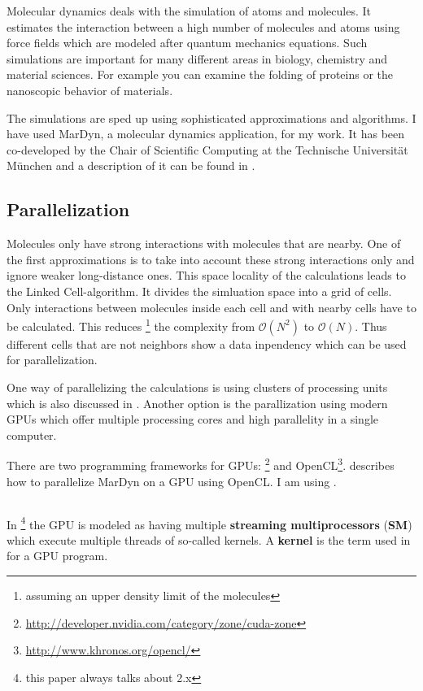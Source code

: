 Molecular dynamics deals with the simulation of atoms and molecules. It estimates the interaction between a high number of molecules and atoms using force fields which are modeled after quantum mechanics equations. 
Such simulations are important for many different areas in biology, chemistry and material sciences. For example you can examine the folding of proteins or the nanoscopic behavior of materials.

The simulations are sped up using sophisticated approximations and algorithms. I have used MarDyn, a molecular dynamics application, for my work. It has been co-developed by the Chair of Scientific Computing at the Technische Universit\"at M\"unchen and a description of it can be found in \cite{buchholz10framework}.

\subsection{Parallelization}
Molecules only have strong interactions with molecules that are nearby. One of the first approximations is to take into account these strong interactions only and ignore weaker long-distance ones.
This space locality of the calculations leads to the Linked Cell-algorithm. It divides the simluation space into a grid of cells. Only interactions between molecules inside each cell and with nearby cells have to be calculated. This reduces \footnote{assuming an upper density limit of the molecules}  
 the complexity from $ \mathcal{O} \left( N^2 \right) $ to $ \mathcal{O} \left( N \right) $.
Thus different cells that are not neighbors show a data inpendency which can be used for parallelization.

One way of parallelizing the calculations is using clusters of processing units which is also discussed in \cite{buchholz10framework}. Another option is the parallization using modern GPUs which offer multiple processing cores and high parallelity in a single computer.

There are two programming frameworks for GPUs: \cuda{}\footnote{\url{http://developer.nvidia.com/category/zone/cuda-zone}} and OpenCL\footnote{\url{http://www.khronos.org/opencl/}}.
\cite{orend10numerische} describes how to parallelize MarDyn on a GPU using OpenCL. I am using \cuda{}.

\subsection{\cuda{}}
In \cuda{}\footnote{this paper always talks about \cuda{} 2.x} the GPU is modeled as having multiple \textbf{streaming multiprocessors} (\textbf{SM}) which execute multiple threads of so-called kernels. A \textbf{kernel} is the term used in \cuda{} for a GPU program.

